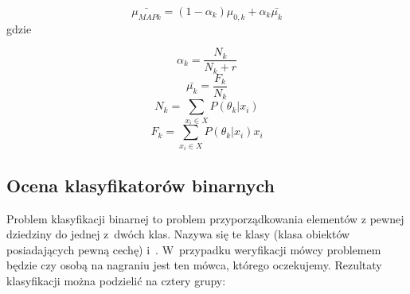 $$\bar{\mu_{MAP k}} = (1 - \alpha_k) \mu_{0,k} + \alpha_k \bar{\mu_k}$$
gdzie

$$\alpha_k = \frac{N_k}{N_k + r}$$
$$\bar{\mu_k} = \frac{F_k}{N_k}$$
$$N_k = \sum_{x_i \in X} P(\theta_k | x_i)$$
$$F_k = \sum_{x_i \in X} P(\theta_k | x_i) x_i$$



%

%
%
%
%
%



\subsection{Ocena klasyfikatorów binarnych}

Problem klasyfikacji binarnej to problem przyporządkowania elementów z
pewnej dziedziny do jednej z~dwóch klas. Nazywa się te klasy
 (klasa obiektów posiadających pewną cechę) i~.
W~przypadku weryfikacji mówcy problemem będzie czy osobą na nagraniu jest ten mówca, którego oczekujemy.
Rezultaty klasyfikacji można podzielić na cztery grupy:

